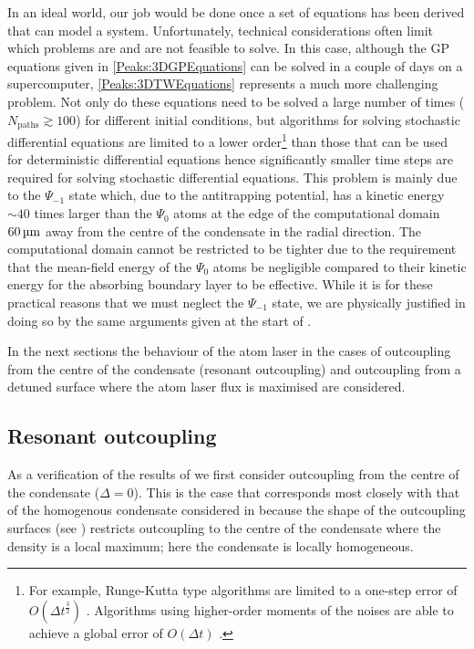 In an ideal world, our job would be done once a set of equations has been derived that can model a system. Unfortunately, technical considerations often limit which problems are and are not feasible to solve. In this case, although the GP equations given in \eqref{Peaks:3DGPEquations} can be solved in a couple of days on a supercomputer, \eqref{Peaks:3DTWEquations} represents a much more challenging problem. Not only do these equations need to be solved a large number of times ($N_\text{paths} \gtrsim 100$) for different initial conditions, but algorithms for solving stochastic differential equations are limited to a lower order\footnote{For example, Runge-Kutta type algorithms are limited to a one-step error of $\displaystyle O(\Delta t^\frac{3}{2})$ \citep{Ruemelin:1982}. Algorithms using higher-order moments of the noises are able to achieve a global error of $\displaystyle O(\Delta t)$ \citep{Burrage:2004}.} than those that can be used for deterministic differential equations hence  significantly smaller time steps are required for solving stochastic differential equations. This problem is mainly due to the $\Psi_{-1}$ state which, due to the antitrapping potential, has a kinetic energy $\sim 40$ times larger than the $\Psi_{0}$ atoms at the edge of the computational domain $\unit[60]{\micro m}$ away from the centre of the condensate in the radial direction. The computational domain cannot be restricted to be tighter due to the requirement that the mean-field energy of the $\Psi_{0}$ atoms be negligible compared to their kinetic energy for the absorbing boundary layer to be effective. While it is for these practical reasons that we must neglect the $\Psi_{-1}$ state, we are physically justified in doing so by the same arguments given at the start of .

In the next sections the behaviour of the atom laser in the cases of outcoupling from the centre of the condensate (resonant outcoupling) and outcoupling from a detuned surface where the atom laser flux is maximised are considered.

\subsection{Resonant outcoupling}

As a verification of the results of  we first consider outcoupling from the centre of the condensate ($\Delta = 0$). This is the case that corresponds most closely with that of the homogenous condensate considered in  because the shape of the outcoupling surfaces (see ) restricts outcoupling to the centre of the condensate where the density is a local maximum; here the condensate is locally homogeneous.

